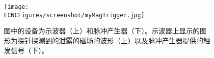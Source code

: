\begin{figure}[H]
\centering
\texttt{[image: \\FCNCFigures/screenshot/myMagTrigger.jpg]}
\caption{图中的设备为示波器（上）和脉冲产生器（下）。示波器上显示的图形为探针探测到的泄露的磁场的波形（上）以及脉冲产生器提供的触发信号（下）。}
\label{fig:wave}
\end{figure}
